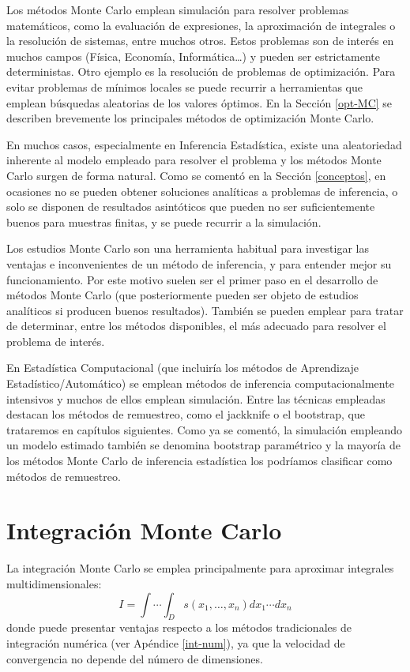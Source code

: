 \documentclass[
]{book}
\theoremstyle{break}
\theoremstyle{nonumberplain}
\begin{document}
Los métodos Monte Carlo emplean simulación para resolver problemas matemáticos, como la evaluación de expresiones, la aproximación de integrales o la resolución de sistemas, entre muchos otros.
Estos problemas son de interés en muchos campos (Física, Economía, Informática\ldots) y pueden ser estrictamente deterministas.
Otro ejemplo es la resolución de problemas de optimización.
Para evitar problemas de mínimos locales se puede recurrir a herramientas que emplean búsquedas aleatorias de los valores óptimos.
En la Sección \ref{opt-MC} se describen brevemente los principales métodos de optimización Monte Carlo.

En muchos casos, especialmente en Inferencia Estadística, existe una aleatoriedad inherente al modelo empleado para resolver el problema y los métodos Monte Carlo surgen de forma natural.
Como se comentó en la Sección \ref{conceptos}, en ocasiones no se pueden obtener soluciones analíticas a problemas de inferencia, o solo se disponen de resultados asintóticos que pueden no ser suficientemente buenos para muestras finitas, y se puede recurrir a la simulación.

Los estudios Monte Carlo son una herramienta habitual para investigar las ventajas e inconvenientes de un método de inferencia, y para entender mejor su funcionamiento.
Por este motivo suelen ser el primer paso en el desarrollo de métodos Monte Carlo (que posteriormente pueden ser objeto de estudios analíticos si producen buenos resultados).
También se pueden emplear para tratar de determinar, entre los métodos disponibles, el más adecuado para resolver el problema de interés.

En Estadística Computacional (que incluiría los métodos de Aprendizaje Estadístico/Automático) se emplean métodos de inferencia computacionalmente intensivos y muchos de ellos emplean simulación.
Entre las técnicas empleadas destacan los métodos de remuestreo, como el jackknife o el bootstrap, que trataremos en capítulos siguientes.
Como ya se comentó, la simulación empleando un modelo estimado también se denomina bootstrap paramétrico y la mayoría de los métodos Monte Carlo de inferencia estadística los podríamos clasificar como métodos de remuestreo.

\hypertarget{int-MC}{%
\section{Integración Monte Carlo}\label{int-MC}}

La integración Monte Carlo se emplea principalmente para aproximar integrales multidimensionales:
\[I = \int \cdots \int _D s\left( x_1,\ldots ,x_n\right) dx_1 \cdots dx_n\]
donde puede presentar ventajas respecto a los métodos tradicionales de integración numérica (ver Apéndice \ref{int-num}), ya que la velocidad de convergencia no depende del número de dimensiones.
\end{document}
